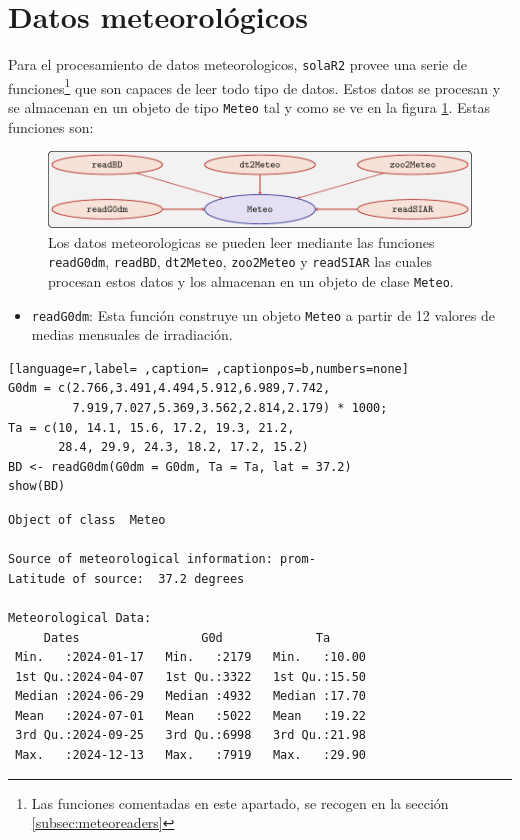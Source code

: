 \section{Datos meteorológicos}
\label{sec:org19b770d}
\label{sec:datos-meteorologicos}
Para el procesamiento de datos meteorologicos, \texttt{solaR2} provee una serie de funciones\footnote{Las funciones comentadas en este apartado, se recogen en la sección \ref{subsec:meteoreaders}} que son capaces de leer todo tipo de datos. Estos datos se procesan y se almacenan en un objeto de tipo \texttt{Meteo} tal y como se ve en la figura \ref{fig:meteo}. Estas funciones son:
\begin{figure}[]
\centering
\includegraphics[keepaspectratio,width=\textwidth,height=0.5\textheight]{figuras/meteo.pdf}
\caption{Los datos meteorologicas se pueden leer mediante las funciones \texttt{readG0dm}, \texttt{readBD}, \texttt{dt2Meteo}, \texttt{zoo2Meteo} y \texttt{readSIAR} las cuales procesan estos datos y los almacenan en un objeto de clase \texttt{Meteo}. \label{fig:meteo}}
\end{figure}
\begin{itemize}
\item \texttt{readG0dm}: Esta función construye un objeto \texttt{Meteo} a partir de 12 valores de medias mensuales de irradiación.
\end{itemize}
\begin{lstlisting}[language=r,label= ,caption= ,captionpos=b,numbers=none]
G0dm = c(2.766,3.491,4.494,5.912,6.989,7.742,
         7.919,7.027,5.369,3.562,2.814,2.179) * 1000;
Ta = c(10, 14.1, 15.6, 17.2, 19.3, 21.2,
       28.4, 29.9, 24.3, 18.2, 17.2, 15.2)
BD <- readG0dm(G0dm = G0dm, Ta = Ta, lat = 37.2)
show(BD)
\end{lstlisting}

\begin{verbatim}
Object of class  Meteo 

Source of meteorological information: prom- 
Latitude of source:  37.2 degrees

Meteorological Data:
     Dates                 G0d             Ta       
 Min.   :2024-01-17   Min.   :2179   Min.   :10.00  
 1st Qu.:2024-04-07   1st Qu.:3322   1st Qu.:15.50  
 Median :2024-06-29   Median :4932   Median :17.70  
 Mean   :2024-07-01   Mean   :5022   Mean   :19.22  
 3rd Qu.:2024-09-25   3rd Qu.:6998   3rd Qu.:21.98  
 Max.   :2024-12-13   Max.   :7919   Max.   :29.90
\end{verbatim}

